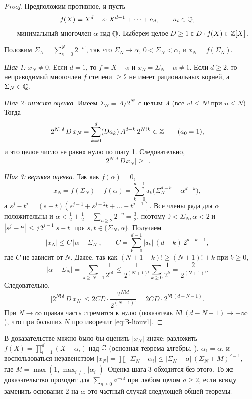 \begin{proof}
Предположим противное, и пусть
\[
f(X)=X^d+a_1X^{d-1}+\dots+a_d,\qquad a_i\in\mathbb Q,
\]
~--- минимальный многочлен $\alpha$ над $\mathbb Q$. Выберем целое $D\ge1$ с $D\cdot f(X)\in\mathbb Z[X]$.

Положим $\Sigma_N=\sum_{n=0}^N2^{-n!}$, так что $\Sigma_N\to\alpha$, $0<\Sigma_N<\alpha$, и $x_N=f(\Sigma_N)$.

\emph{Шаг 1: $x_N\ne0$.} Если $d=1$, то $f=X-\alpha$ и $x_N=\Sigma_N-\alpha\ne0$. Если $d\ge2$, то неприводимый многочлен
$f$ степени $\ge2$ не имеет рациональных корней, а $\Sigma_N\in\mathbb Q$.

\emph{Шаг 2: нижняя оценка.} Имеем $\Sigma_N=A/2^{N!}$ с целым $A$ (все $n!\le N!$ при $n\le N$). Тогда
\[
2^{N!\,d}\,D\,x_N=\sum_{k=0}^{d}(Da_k)\,A^{d-k}\,2^{N!\,k}\in\mathbb Z\qquad(a_0=1),
\]
и это целое число не равно нулю по шагу 1. Следовательно,
\begin{equation}\label{eq:B-liouv1}
\bigl|2^{N!\,d}\,D\,x_N\bigr|\ge1.
\end{equation}

\emph{Шаг 3: верхняя оценка.} Так как $f(\alpha)=0$,
\[
x_N=f(\Sigma_N)-f(\alpha)=\sum_{k=0}^{d-1}a_k\bigl(\Sigma_N^{d-k}-\alpha^{d-k}\bigr),
\]
а $s^j-t^j=(s-t)(s^{j-1}+s^{j-2}t+\dots+t^{j-1})$. Все члены ряда для $\alpha$ положительны и $\alpha<\frac12+\frac12+\sum_{n\ge2}2^{-n}=\frac32$,
поэтому $0<\Sigma_N,\alpha<2$ и $|s^j-t^j|\le j\,2^{j-1}|s-t|$ при $s,t\in\{\Sigma_N,\alpha\}$. Получаем
\[
|x_N|\le C\,|\alpha-\Sigma_N|,\qquad C=\sum_{k=0}^{d-1}|a_k|\,(d-k)\,2^{d-k-1},
\]
где $C$ не зависит от $N$. Далее, так как $(N+1+k)!\ge(N+1)!+k$ при $k\ge0$,
\[
|\alpha-\Sigma_N|=\sum_{n\ge N+1}\frac{1}{2^{n!}}\le\frac{1}{2^{(N+1)!}}\sum_{k\ge0}\frac1{2^k}=\frac{2}{2^{(N+1)!}}.
\]
Следовательно,
\[
\bigl|2^{N!\,d}\,D\,x_N\bigr|\le 2CD\cdot\frac{2^{N!\,d}}{2^{(N+1)!}}=2CD\cdot2^{N!\,(d-N-1)}.
\]
При $N\to\infty$ правая часть стремится к нулю (показатель $N!\,(d-N-1)\to-\infty$), что при больших $N$ противоречит
\eqref{eq:B-liouv1}.
\end{proof}

В доказательстве можно было бы оценить $|x_N|$ иначе: разложить $f(X)=\prod_{i=1}^d(X-\alpha_i)$ над $\mathbb C$ (основная теорема
алгебры, ), $\alpha_1=\alpha$, и воспользоваться неравенством
$|x_N|=\prod_i|\Sigma_N-\alpha_i|\le|\Sigma_N-\alpha|\,(\Sigma_N+M)^{d-1}$, где $M=\max(1,\max_{i\ne1}|\alpha_i|)$. Оценка
шага 3 обходится без этого. То же доказательство проходит для $\sum_{n\ge0}a^{-n!}$ при любом целом $a\ge2$, если всюду заменить основание $2$ на $a$; это
частный случай следующей общей теоремы.

